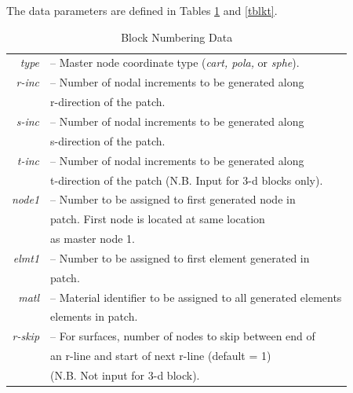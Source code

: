The data parameters are defined in Tables \ref{tblkn} and \ref{tblkt}.

\begin{table}
\begin{center}
\begin{tabular}{r l}
\it type   &-- Master node coordinate type ({\it cart, pola,} or {\it sphe}). \\
\it r-inc  &-- Number of nodal increments to be generated along \\
           &\quad r-direction of the patch. \\
\it s-inc  &-- Number of nodal increments to be generated along \\
           &\quad s-direction of the patch. \\
\it t-inc  &-- Number of nodal increments to be generated along \\
           &\quad t-direction of the patch (N.B. Input for 3-d blocks only). \\
\it node1  &-- Number to be assigned to first generated node in \\
           &\quad patch.  First node is located at same location \\
           &\quad as master node 1. \\
\it elmt1  &-- Number to be assigned to first element generated in \\
           &\quad patch. \\
\it matl   &-- Material identifier to be assigned to all generated elements \\
           &\quad elements in patch. \\
\it r-skip &-- For surfaces, number of nodes to skip between end of \\
           &\quad an r-line and start of next r-line (default = 1) \\
           &\quad (N.B. Not input for 3-d block). \\
\end{tabular}
\end{center}
\caption{Block Numbering Data}
\label{tblkn}
\end{table}
